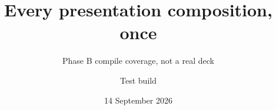 %
\documentclass[theme=executive,publication-type=presentation]{reportkit-slides}

\title{Every presentation composition, once}
\subtitle{Phase B compile coverage, not a real deck}
\author{Test build}
\date{14 September 2026}



\begin{frame}[plain]
\begin{titleslide}
\end{titleslide}
\end{frame}

\begin{frame}[plain]
\begin{sectiondivider}{Message and evidence}
\end{sectiondivider}
\end{frame}

\begin{frame}
\begin{messageslide}{Beamer renders every semantic box unmodified}
The callout, metric, code, and diagram modules were built against the renderer-hook
contract A3 introduced, not against the paged renderer specifically.
\end{messageslide}
\end{frame}

